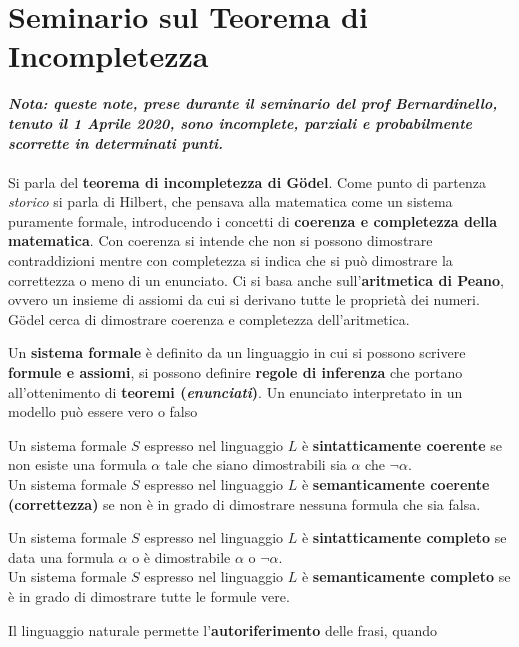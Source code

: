 \documentclass[a4paper,12pt, oneside]{book}
\begin{document}
\chapter{Seminario sul Teorema di Incompletezza}
\textit{\textbf{Nota: queste note, prese durante il seminario del prof
    Bernardinello, tenuto il 1 Aprile 2020, sono incomplete, parziali e
    probabilmente scorrette in determinati punti.}}\\\\
Si parla del \textbf{teorema di incompletezza di G\"{o}del}. Come punto di
partenza \textit{storico} si parla di Hilbert, che pensava alla matematica come
un sistema puramente formale, introducendo i concetti di \textbf{coerenza e
  completezza della matematica}. Con coerenza si intende che non si possono
dimostrare contraddizioni mentre con completezza si indica che si può dimostrare
la correttezza o meno di un enunciato. Ci si basa anche sull'\textbf{aritmetica
  di Peano}, ovvero un insieme di assiomi da cui si derivano tutte le proprietà
dei numeri. \\
G\"{o}del cerca di dimostrare coerenza e completezza dell'aritmetica.
\begin{definizione}
  Un \textbf{sistema formale} è definito da un linguaggio in cui si possono
  scrivere \textbf{formule e assiomi}, si possono definire \textbf{regole di
    inferenza} che portano all'ottenimento di \textbf{teoremi
    (\textit{enunciati})}. Un enunciato interpretato in un modello può essere
  vero o falso
\end{definizione}
\begin{definizione}
  Un sistema formale $S$ espresso nel linguaggio $L$ è \textbf{sintatticamente
    coerente} se non esiste una formula $\alpha$ tale che siano dimostrabili sia
  $\alpha$ che $\neg \alpha$.\\
  Un sistema formale $S$ espresso nel linguaggio $L$ è \textbf{semanticamente
    coerente (correttezza)} se non è in grado di dimostrare nessuna formula che
  sia falsa.
\end{definizione}
\begin{definizione}
  Un sistema formale $S$ espresso nel linguaggio $L$ è \textbf{sintatticamente
    completo} se data una formula $\alpha$ o è dimostrabile $\alpha$ o
  $\neg\alpha$.\\
  Un sistema formale $S$ espresso nel linguaggio $L$ è \textbf{semanticamente
    completo} se è in grado di dimostrare tutte le formule vere.
\end{definizione}
Il linguaggio naturale permette l'\textbf{autoriferimento} delle frasi, quando
\end{document}
